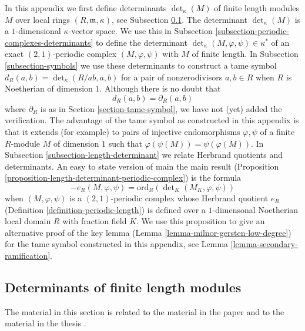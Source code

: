 \noindent
In this appendix we first define determinants $\det_\kappa(M)$
of finite length modules $M$ over local rings $(R, \mathfrak m, \kappa)$,
see Subsection \ref{subsection-determinants-finite-length}.
The determinant $\det_\kappa(M)$ is a $1$-dimensional $\kappa$-vector space.
We use this in Subsection \ref{subsection-periodic-complexes-determinants}
to define the determinant $\det_\kappa(M, \varphi, \psi) \in \kappa^*$
of an exact $(2, 1)$-periodic complex $(M, \varphi, \psi)$
with $M$ of finite length. In Subsection \ref{subsection-symbols}
we use these determinants to construct a tame symbol
$d_R(a, b) = \det_\kappa(R/ab, a, b)$ for a pair of nonzerodivisors
$a, b \in R$ when $R$ is Noetherian of dimension $1$.
Although there is no doubt that
$$
d_R(a, b) = \partial_R(a, b)
$$
where $\partial_R$ is as in Section \ref{section-tame-symbol},
we have not (yet) added the verification. The advantage of the
tame symbol as constructed in this appendix is that it extends
(for example) to pairs of injective endomorphisms $\varphi, \psi$
of a finite $R$-module $M$ of dimension $1$ such that
$\varphi(\psi(M)) = \psi(\varphi(M))$. In
Subsection \ref{subsection-length-determinant}
we relate Herbrand quotients and determinants.
An easy to state version of main the main result
(Proposition \ref{proposition-length-determinant-periodic-complex})
is the formula
$$
-e_R(M, \varphi, \psi) =
\text{ord}_R(\det\nolimits_K(M_K, \varphi, \psi))
$$
when $(M, \varphi, \psi)$ is a $(2, 1)$-periodic complex
whose Herbrand quotient $e_R$ (Definition \ref{definition-periodic-length})
is defined
over a $1$-dimensonal Noetherian local domain $R$ with fraction field $K$.
We use this proposition to give an alternative proof of the key lemma
(Lemma \ref{lemma-milnor-gersten-low-degree})
for the tame symbol constructed in this appendix, see
Lemma \ref{lemma-secondary-ramification}.


\subsection{Determinants of finite length modules}
\label{subsection-determinants-finite-length}

\noindent
The material in this section is related to the material in
the paper \cite{determinant} and to the material in the
thesis \cite{Joe}.

